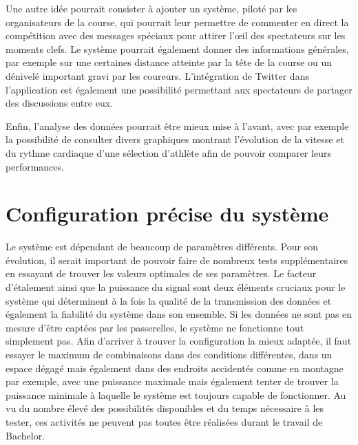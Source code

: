 Une autre idée pourrait consister à ajouter un système, piloté par les organisateurs de la course, qui pourrait leur permettre de commenter en direct la compétition avec des messages spéciaux pour attirer l'œil des spectateurs sur les moments clefs. Le système pourrait également donner des informations générales, par exemple sur une certaines distance atteinte par la tête de la course ou un dénivelé important gravi par les coureurs. L'intégration de Twitter dans l'application est également une possibilité permettant aux spectateurs de partager des discussions entre eux.

Enfin, l'analyse des données pourrait être mieux mise à l'avant, avec par exemple la possibilité de consulter divers graphiques montrant l'évolution de la vitesse et du rythme cardiaque d'une sélection d'athlète afin de pouvoir comparer leurs performances.

\section{Configuration précise du système}

Le système est dépendant de beaucoup de paramètres différents. Pour son évolution, il serait important de pouvoir faire de nombreux tests supplémentaires en essayant de trouver les valeurs optimales de ses paramètres. Le facteur d'étalement ainsi que la puissance du signal sont deux éléments cruciaux pour le système qui déterminent à la fois la qualité de la transmission des données et également la fiabilité du système dans son ensemble. Si les données ne sont pas en mesure d'être captées par les passerelles, le système ne fonctionne tout simplement pas. Afin d'arriver à trouver la configuration la mieux adaptée, il faut essayer le maximum de combinaisons dans des conditions différentes, dans un espace dégagé mais également dans des endroits accidentés comme en montagne par exemple, avec une puissance maximale mais également tenter de trouver la puissance minimale à laquelle le système est toujours capable de fonctionner. Au vu du nombre élevé des possibilités disponibles et du temps nécessaire à les tester, ces activités ne peuvent pas toutes être réalisées durant le travail de Bachelor.